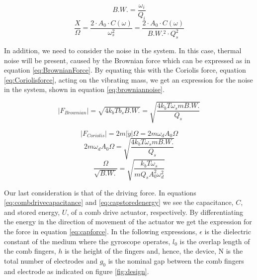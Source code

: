 \documentclass[12pt,a4paper,titlepage]{article}
\begin{document}
\begin{spacing}{1.1}
\begin{equation}
B.W.= \dfrac{\omega_i}{Q_i}
\label{eq:bandwith}
\end{equation}
\begin{equation}
\dfrac{X}{\Omega}=\dfrac{2 \cdot A_0 \cdot C (\omega)}{\omega_s^2}=\dfrac{2 \cdot A_0 \cdot C (\omega)}{B.W.^2 \cdot Q_s^2}
\label{eq:bandwithsensitivitytradeoff}
\end{equation}

In addition, we need to consider the noise in the system. In this case, thermal noise will be present, caused by the Brownian force which can be expressed as in equation \ref{eq:BrownianForce}. By equating this with the Coriolis force, equation \ref{eq:Coriolisforce}, acting on the vibrating mass, we get an expression for the noise in the system, shown in equation \ref{eq:browniannoise}.

\begin{equation}
\lvert F_{Brownian}\rvert = \sqrt{4k_b T b_s B.W.} = \sqrt{\dfrac{4k_b T \omega_s m B.W.}{Q_s}}
\label{eq:BrownianForce}
\end{equation}

\begin{equation}
\lvert F_{Coriolis}\rvert = 2 m \lvert \dot{y} \rvert \Omega = 2 m \omega_d A_0 \Omega
\label{eq:Coriolisforce}
\end{equation}
\begin{equation}
2 m \omega_d A_0 \Omega = \sqrt{\dfrac{4k_b T \omega_s m B.W.}{Q_s}}
\label{eq:brownequcori}
\end{equation}
\begin{equation}
\dfrac{\Omega}{\sqrt{B.W.}} = \sqrt{\dfrac{k_b T \omega_s}{m Q_s A_0^2 \omega_d^2}}
\label{eq:browniannoise}
\end{equation}

Our last consideration is that of the driving force. In equations \ref{eq:combdrivecapacitance} and \ref{eq:capstoredenergy} we see the capacitance, $C$, and stored energy, $ U $, of a comb drive actuator, respectively. By differentiating the energy in the direction of movement of the actuator we get the expression for the force in equation \ref{eq:capforce}. In the following expressions, $\epsilon$ is the dielectric constant of the medium where the gyroscope operates, $l_0$ is the overlap length of the comb fingers, $h$ is the height of the fingers and, hence, the device, N is the total number of electrodes and $g_0$ is the nominal gap between the comb fingers and electrode as indicated on figure \ref{fig:design}.


\end{spacing}
\end{document}
